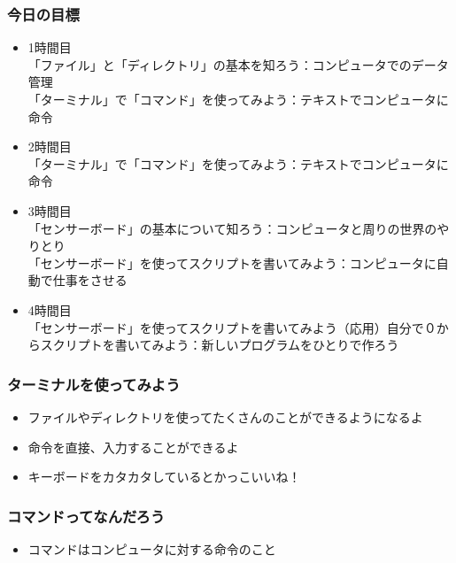 \begin{frame}
    \frametitle{今日の目標} 
    \begin{itemize}
        \item 1時間目\\
        {\footnotesize「ファイル」と「ディレクトリ」の基本を知ろう：コンピュータでのデータ管理\\
        「ターミナル」で「コマンド」を使ってみよう：テキストでコンピュータに命令\\}
        \item 2時間目\\
        {\footnotesize「ターミナル」で「コマンド」を使ってみよう：テキストでコンピュータに命令\\}
        \item 3時間目\\
        {\footnotesize「センサーボード」の基本について知ろう：コンピュータと周りの世界のやりとり\\
        「センサーボード」を使ってスクリプトを書いてみよう：コンピュータに自動で仕事をさせる\\}
        \item 4時間目\\
        {\footnotesize「センサーボード」を使ってスクリプトを書いてみよう（応用）自分で０からスクリプトを書いてみよう：新しいプログラムをひとりで作ろう\\}
    \end{itemize}
\end{frame}

\begin{frame}
    \frametitle{ターミナルを使ってみよう}
    \begin{itemize}
        \item ファイルやディレクトリを使ってたくさんのことができるようになるよ
        \item 命令を直接、入力することができるよ
        \item キーボードをカタカタしているとかっこいいね！
    \end{itemize}
    \begin{figure}[h]
        \centering
        
    \end{figure}
\end{frame}

\begin{frame}
    \frametitle{コマンドってなんだろう}
    \begin{itemize}
        \item コマンドはコンピュータに対する命令のこと
    \end{itemize}
    \begin{figure}[h]
        \centering
        
    \end{figure}
\end{frame}


